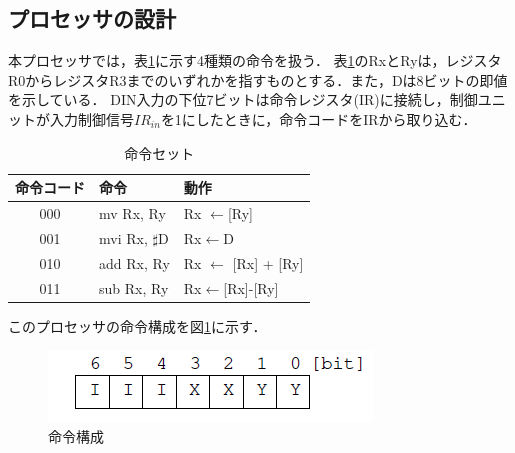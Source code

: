 \documentclass{jlreq}
\numberwithin{equation}{section}
\begin{document}
\subsection{プロセッサの設計}
本プロセッサでは，表\ref{tab:instruction_set}に示す4種類の命令を扱う．
表\ref{tab:instruction_set}のRxとRyは，レジスタR0からレジスタR3までのいずれかを指すものとする．また，Dは8ビットの即値を示している．
DIN入力の下位7ビットは命令レジスタ(IR)に接続し，制御ユニットが入力制御信号$IR_{in}$を1にしたときに，命令コードをIRから取り込む．
\begin{table}[H]
	\centering
	\caption{命令セット}
	\begin{tabular}{c|l|l}
		\hline
		命令コード & 命令              & 動作                        \\ \hline
		000        & mv Rx, Ry         & Rx $\leftarrow $[Ry]        \\
		001        & mvi Rx, $\sharp$D & Rx$\leftarrow$D             \\
		010        & add Rx, Ry        & Rx $\leftarrow$ [Rx] + [Ry] \\
		011        & sub Rx, Ry        & Rx$\leftarrow$[Rx]-[Ry]     \\ \hline
	\end{tabular}
	\label{tab:instruction_set}
\end{table}

このプロセッサの命令構成を図\ref{fig:instruction_composition}に示す．
\begin{figure}[H]
	\centering
	\includegraphics{assets/instruction_composition.png}
	\caption{命令構成}
	\label{fig:instruction_composition}
\end{figure}
\end{document}
